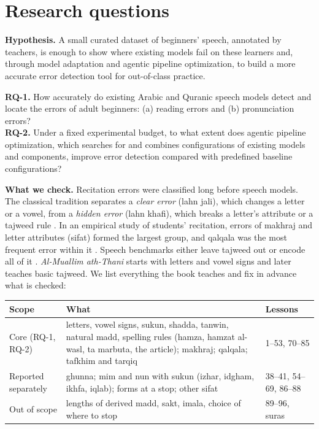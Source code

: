 \documentclass[a4paper,14pt]{extarticle}
\begin{document}
\section{Research questions}

\textbf{Hypothesis.} A small curated dataset of beginners' speech, annotated by teachers, is enough to show
where existing models fail on these learners and, through model adaptation and agentic pipeline
optimization, to build a more accurate error detection tool for out-of-class practice.

\begin{rqbox}
\textbf{RQ-1.} How accurately do existing Arabic and Quranic speech models detect and locate the errors of
adult beginners: (a) reading errors and (b) pronunciation errors?\\[4pt]
\textbf{RQ-2.} Under a fixed experimental budget, to what extent does agentic pipeline optimization, which
searches for and combines configurations of existing models and components, improve error detection
compared with predefined baseline configurations?
\end{rqbox}

\textbf{What we check.} Recitation errors were classified long before speech models. The classical
tradition separates a \emph{clear error} (lahn jali), which changes a letter or a vowel, from a \emph{hidden
error} (lahn khafi), which breaks a letter's attribute or a tajweed rule \cite{SRC-153}. In an empirical study
of students' recitation, errors of makhraj and letter attributes (sifat) formed the largest group, and qalqala
was the most frequent error within it \cite{SRC-152}. Speech benchmarks either leave tajweed out
\cite{SRC-004} or encode all of it \cite{SRC-002}. \emph{Al-Muallim ath-Thani} starts with letters and vowel
signs and later teaches basic tajweed. We list everything the book teaches and fix in advance what is checked:

\begin{center}\small
\begin{tabularx}{\linewidth}{@{}P{3.3cm}LP{2.6cm}@{}}
\toprule
Scope & What & Lessons \\
\midrule
Core (RQ-1, RQ-2) & letters, vowel signs, sukun, shadda, tanwin, natural madd, spelling rules (hamza,
  hamzat al-wasl, ta marbuta, the article); makhraj; qalqala; tafkhim and tarqiq & 1--53, 70--85 \\
Reported separately & ghunna; mim and nun with sukun (izhar, idgham, ikhfa, iqlab); forms at a stop;
  other sifat & 38--41, 54--69, 86--88 \\
Out of scope & lengths of derived madd, sakt, imala, choice of where to stop & 89--96, suras \\
\bottomrule
\end{tabularx}
\end{center}
\end{document}

